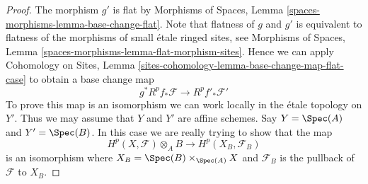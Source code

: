 \begin{proof}
The morphism $g'$ is flat by
Morphisms of Spaces, Lemma \ref{spaces-morphisms-lemma-base-change-flat}.
Note that flatness of $g$ and $g'$ is equivalent to flatness
of the morphisms of small \'etale ringed sites, see
Morphisms of Spaces, Lemma \ref{spaces-morphisms-lemma-flat-morphism-sites}.
Hence we can apply
Cohomology on Sites, Lemma
\ref{sites-cohomology-lemma-base-change-map-flat-case}
to obtain a base change map
$$
g^*R^pf_*\mathcal{F} \longrightarrow R^pf'_*\mathcal{F}'
$$
To prove this map is an isomorphism we can work locally in the \'etale
topology on $Y'$. Thus we may assume that $Y$ and $Y'$ are affine
schemes. Say $Y = \Spec(A)$ and $Y' = \Spec(B)$.
In this case we are really trying to show that the map
$$
H^p(X, \mathcal{F}) \otimes_A B \longrightarrow H^p(X_B, \mathcal{F}_B)
$$
is an isomorphism where $X_B = \Spec(B) \times_{\Spec(A)} X$ and
$\mathcal{F}_B$ is the pullback of $\mathcal{F}$ to $X_B$.


\end{proof}
